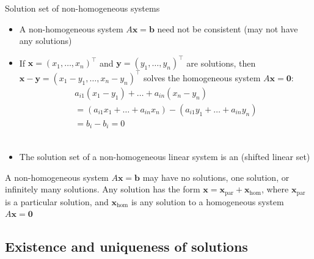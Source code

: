 \documentclass%
[handout]%
{beamer}
\newcommand{\bx}{{\mathbf x}}
\newcommand{\by}{{\mathbf y}}
\begin{document}
\begin{frame}[label=nonhomogeneous]{Solution set of non-homogeneous systems}

\vspace*{-10pt}

\begin{itemize}
  \item A non-homogeneous system $A \bx = \mathbf{b}$ need not be consistent (may not have any solutions)
  \item If $\bx = (x_1,\dots,x_n)^\top$ and $\by = (y_1,\dots,y_n)^\top$   are solutions, then  $\bx-\by = (x_1 - y_1 , \dots,x_n - y_n)^\top$ solves the homogeneous system $A\bx = \mathbf{0}$:\\[-20pt]
    \begin{multline*}
          a_{i1}(x_1 - y_1) +  \dots + a_{in}(x_n-y_n)\\
          = (a_{i1}x_1 +  \dots + a_{in}x_n) -
           (a_{i1}y_1 +  \dots + a_{in}y_n) \\= b_i - b_i = 0
    \end{multline*}\\[-25pt]
  \item The \alert{solution set} of a non-homogeneous linear system is an  (shifted linear set)
\end{itemize}

\begin{theorem}
  A non-homogeneous system $A \bx = \mathbf{b}$ may have \alert{no} solutions, \alert{one} solution,  or \alert{infinitely many} solutions. Any solution has the form $\bx = \bx_{\mathrm{par}} + \bx_{\mathrm{hom}}$, where $\bx_{\mathrm{par}}$ is a particular solution, and $\bx_{\mathrm{hom}}$ is any solution to a homogeneous system $A\bx = \mathbf{0}$
\end{theorem}

\end{frame}

\subsection{Existence and uniqueness of solutions}
\end{document}
